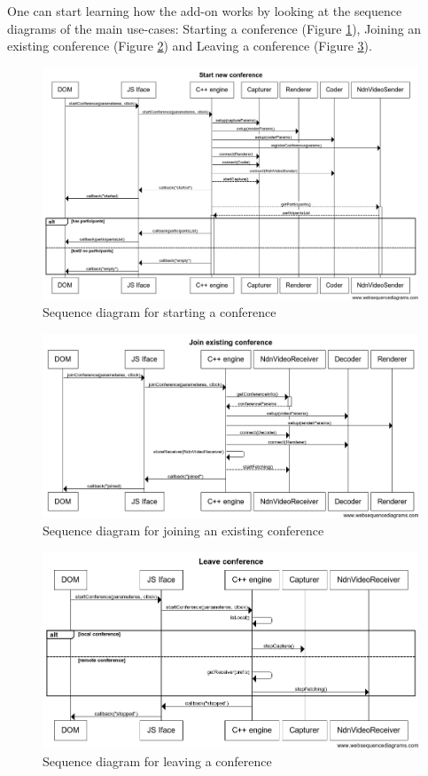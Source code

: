 \documentclass[12pt]{article}
\begin{document}
One can start learning how the add-on works by looking at the sequence diagrams of the main use-cases: Starting a conference (Figure \ref{fig:start}), Joining an existing conference (Figure \ref{fig:join}) and Leaving a conference (Figure \ref{fig:leave}).

\begin{figure}
\centering
\includegraphics[width=\textwidth]{../res/graphics/start-seq}
\caption{Sequence diagram for starting a conference}
\label{fig:start}
\end{figure}

\begin{figure}
\centering
\includegraphics[width=\textwidth]{../res/graphics/join-seq}
\caption{Sequence diagram for joining an existing conference}
\label{fig:join}
\end{figure}

\begin{figure}
\centering
\includegraphics[width=\textwidth]{../res/graphics/leave-seq}
\caption{Sequence diagram for leaving a conference}
\label{fig:leave}
\end{figure}
\end{document}
